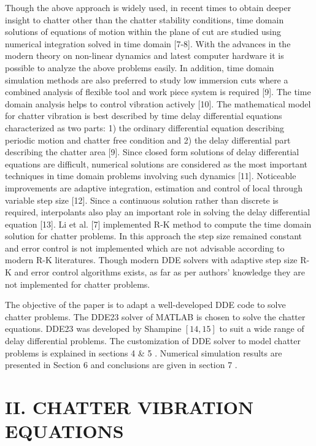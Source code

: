 \documentclass[10pt]{article}
\begin{document}
Though the above approach is widely used, in recent times to obtain deeper insight to chatter other than the chatter stability conditions, time domain solutions of equations of motion within the plane of cut are studied using numerical integration solved in time domain [7-8]. With the advances in the modern theory on non-linear dynamics and latest computer hardware it is possible to analyze the above problems easily. In addition, time domain simulation methods are also preferred to study low immersion cuts where a combined analysis of flexible tool and work piece system is required [9]. The time domain analysis helps to control vibration actively [10]. The mathematical model for chatter vibration is best described by time delay differential equations characterized as two parts: 1) the ordinary differential equation describing periodic motion and chatter free condition and 2) the delay differential part describing the chatter area [9]. Since closed form solutions of delay differential equations are difficult, numerical solutions are considered as the most important techniques in time domain problems involving such dynamics [11]. Noticeable improvements are adaptive integration, estimation and control of local through variable step size [12]. Since a continuous solution rather than discrete is required, interpolants also play an important role in solving the delay differential equation [13]. Li et al. [7] implemented R-K method to compute the time domain solution for chatter problems. In this approach the step size remained constant and error control is not implemented which are not advisable according to modern R-K literatures. Though modern DDE solvers with adaptive step size R-K and error control algorithms exists, as far as per authors' knowledge they are not implemented for chatter problems.

The objective of the paper is to adapt a well-developed DDE code to solve chatter problems. The DDE23 solver of MATLAB is chosen to solve the chatter equations. DDE23 was developed by Shampine \(\left\lbrack  {{14},{15}}\right\rbrack\) to suit a wide range of delay differential problems. The customization of DDE solver to model chatter problems is explained in sections 4 \& 5 . Numerical simulation results are presented in Section 6 and conclusions are given in section 7 .

\section*{II. CHATTER VIBRATION EQUATIONS}
\end{document}
